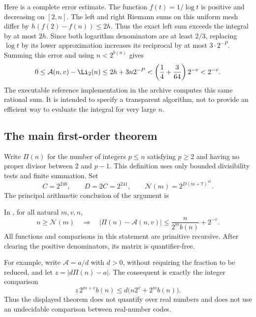 Here is a complete error estimate. The function $f(t)=1/\log t$ is
positive and decreasing on $[2,n]$. The left and right Riemann sums on
this uniform mesh differ by $h(f(2)-f(n))\le2h$. Thus the exact left
sum exceeds the integral by at most $2h$. Since both logarithm
denominators are at least $2/3$, replacing $\log t$ by its lower
approximation increases its reciprocal by at most $3\cdot2^{-P}$.
Summing this error and using $n<2^{b(n)}$ gives
\begin{equation}\label{eq:Li-error}
 0\le\mathcal A(n,v)-\Li_2(n)
 \le 2h+3n2^{-P}
 <\left(\frac14+\frac3{64}\right)2^{-v}<2^{-v}.
\end{equation}
The executable reference implementation in the archive computes this
same rational sum. It is intended to specify a transparent algorithm,
not to provide an efficient way to evaluate the integral for very large $n$.

\subsection{The main first-order theorem}

Write $\Pi(n)$ for the number of integers $p\le n$ satisfying
$p\ge2$ and having no proper divisor between $2$ and $p-1$.
This definition uses only bounded divisibility tests and finite summation.
Set
\[
 C=2^{240},\qquad D=2C=2^{241},\qquad
 \mathcal N(m)=2^{D(m+7)^{10}}.
\]
The principal arithmetic conclusion of the argument is
\begin{theorem}\label{thm:object}
In \ipra, for all natural $m,v,n$,
\begin{equation}\label{eq:object-target}
 n\ge\mathcal N(m)\quad\Longrightarrow\quad
 \left|\Pi(n)-\mathcal A(n,v)\right|
 \le \frac{n}{2^m b(n)}+2^{-v}.
\end{equation}
All functions and comparisons in this statement are primitive recursive.
After clearing the positive denominators, its matrix is quantifier-free.
\end{theorem}

For example, write $\mathcal A=a/d$ with $d>0$, without requiring the
fraction to be reduced, and let $z=|d\Pi(n)-a|$. The consequent is exactly
the integer comparison
\begin{equation}\label{eq:integer-matrix}
 z\,2^{m+v}b(n)
 \le d\bigl(n2^v+2^m b(n)\bigr).
\end{equation}
Thus the displayed theorem does not quantify over real numbers and does
not use an undecidable comparison between real-number codes.

